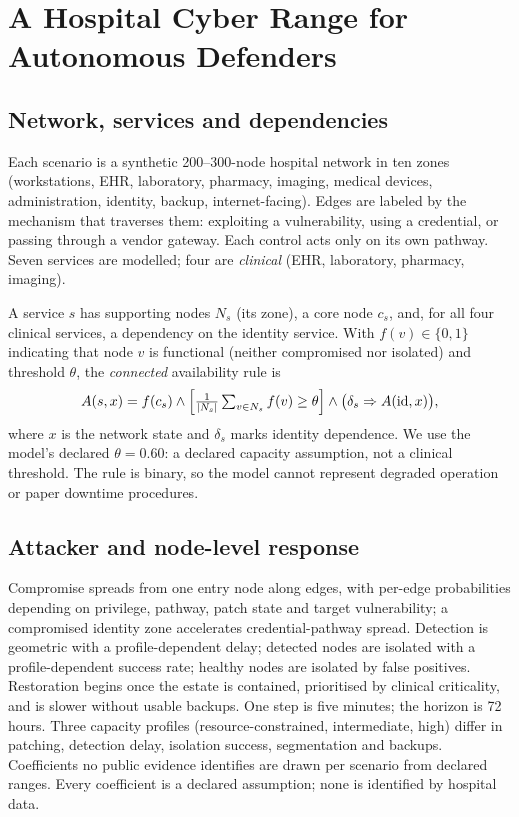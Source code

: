 \documentclass[conference,compsoc]{IEEEtran}
\begin{document}
\section{A Hospital Cyber Range for Autonomous Defenders}
\label{sec:range}

\subsection{Network, services and dependencies}

Each scenario is a synthetic 200--300-node hospital network in ten zones
(workstations, EHR, laboratory, pharmacy, imaging, medical devices,
administration, identity, backup, internet-facing). Edges are labeled by
the mechanism that traverses them: exploiting a vulnerability, using a
credential, or passing through a vendor gateway. Each control acts only on
its own pathway. Seven services are modelled; four are \emph{clinical}
(EHR, laboratory, pharmacy, imaging).

A service $s$ has supporting nodes $N_s$ (its zone), a core node $c_s$,
and, for all four clinical services, a dependency on the identity service.
With $f(v)\in\{0,1\}$ indicating that node $v$ is functional (neither
compromised nor isolated) and threshold $\theta$, the \emph{connected}
availability rule is
\begin{equation}
A(s,x)=f(c_s)\wedge\Bigl[\tfrac{1}{|N_s|}\textstyle\sum_{v\in N_s}f(v)\ge\theta\Bigr]
\wedge\bigl(\delta_s\Rightarrow A(\mathrm{id},x)\bigr),
\label{eq:avail}
\end{equation}
where $x$ is the network state and $\delta_s$ marks identity dependence.
We use the model's declared $\theta=0.60$: a declared capacity assumption,
not a clinical threshold. The rule is binary, so the model cannot represent
degraded operation or paper downtime procedures.

\subsection{Attacker and node-level response}

Compromise spreads from one entry node along edges, with per-edge
probabilities depending on privilege, pathway, patch state and target
vulnerability; a compromised identity zone accelerates credential-pathway
spread. Detection is geometric with a profile-dependent delay; detected
nodes are isolated with a profile-dependent success rate; healthy nodes
are isolated by false positives. Restoration begins once the estate is
contained, prioritised by clinical criticality, and is slower without
usable backups. One step is five minutes; the horizon is 72 hours. Three
capacity profiles (resource-constrained, intermediate, high) differ in
patching, detection delay, isolation success, segmentation and backups.
Coefficients no public evidence identifies are drawn per scenario from
declared ranges. Every coefficient is a declared assumption; none is
identified by hospital data.
\end{document}
